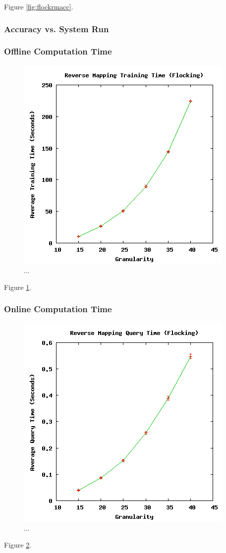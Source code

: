 Figure \ref{fig:flockrmacc}.

  \subsubsection{Accuracy vs. System Run}

  \subsubsection{Offline Computation Time}

\begin{figure}[ht]
\centering
\includegraphics[scale=.5]{images/results_flocking/rmtraining.png}
\caption{...}
\label{fig:flockrmtraining}
\end{figure}

Figure \ref{fig:flockrmtraining}.

  \subsubsection{Online Computation Time}

\begin{figure}[ht]
\centering
\includegraphics[scale=.5]{images/results_flocking/rmquery.png}
\caption{...}
\label{fig:flockrmquery}
\end{figure}

Figure \ref{fig:flockrmquery}.





